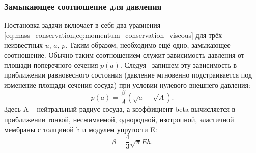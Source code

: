 \subsubsection{Замыкающее соотношение для давления}
Постановка задачи включает в себя два уравнения \cref{eq:mass_conservation,eq:momentum_conservation_viscous}
для трёх неизвестных $u$, $a$, $p$. Таким образом, необходимо ещё одно,
замыкающее соотношение.
Обычно таким соотношением служит зависимость давления от площади поперечного сечения $p(a)$.
Следуя~\cite{Formaggia2003} запишем эту зависимость в приближении равновесного состояния (давление мгновенно подстраивается под изменение площади сечения сосуда)
при условии нулевого внешнего давления:
\begin{equation}
\label{eq:p_from_a}
p(a) = \frac{\beta}{A} \left(\sqrt{a} - \sqrt A\right).
\end{equation}
Здесь \gls{A} -- нейтральный радиус сосуда,
а коэффициент \gls{beta} вычисляется в приближении тонкой, несжимаемой, однородной, изотропной, эластичной мембраны с толщиной \gls{h} и 
модулем упругости \gls{E}:
\begin{equation}
\nonumber
\beta = \frac{4}{3}\sqrt{\pi}E h.
\end{equation}

